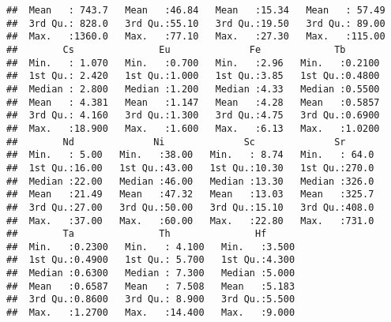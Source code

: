 \documentclass[]{article}
\begin{document}
\begin{verbatim}
##  Mean   : 743.7   Mean   :46.84   Mean   :15.34   Mean   : 57.49  
##  3rd Qu.: 828.0   3rd Qu.:55.10   3rd Qu.:19.50   3rd Qu.: 89.00  
##  Max.   :1360.0   Max.   :77.10   Max.   :27.30   Max.   :115.00  
##        Cs               Eu              Fe             Tb        
##  Min.   : 1.070   Min.   :0.700   Min.   :2.96   Min.   :0.2100  
##  1st Qu.: 2.420   1st Qu.:1.000   1st Qu.:3.85   1st Qu.:0.4800  
##  Median : 2.800   Median :1.200   Median :4.33   Median :0.5500  
##  Mean   : 4.381   Mean   :1.147   Mean   :4.28   Mean   :0.5857  
##  3rd Qu.: 4.160   3rd Qu.:1.300   3rd Qu.:4.75   3rd Qu.:0.6900  
##  Max.   :18.900   Max.   :1.600   Max.   :6.13   Max.   :1.0200  
##        Nd              Ni              Sc              Sr       
##  Min.   : 5.00   Min.   :38.00   Min.   : 8.74   Min.   : 64.0  
##  1st Qu.:16.00   1st Qu.:43.00   1st Qu.:10.30   1st Qu.:270.0  
##  Median :22.00   Median :46.00   Median :13.30   Median :326.0  
##  Mean   :21.49   Mean   :47.32   Mean   :13.03   Mean   :325.7  
##  3rd Qu.:27.00   3rd Qu.:50.00   3rd Qu.:15.10   3rd Qu.:408.0  
##  Max.   :37.00   Max.   :60.00   Max.   :22.80   Max.   :731.0  
##        Ta               Th               Hf       
##  Min.   :0.2300   Min.   : 4.100   Min.   :3.500  
##  1st Qu.:0.4900   1st Qu.: 5.700   1st Qu.:4.300  
##  Median :0.6300   Median : 7.300   Median :5.000  
##  Mean   :0.6587   Mean   : 7.508   Mean   :5.183  
##  3rd Qu.:0.8600   3rd Qu.: 8.900   3rd Qu.:5.500  
##  Max.   :1.2700   Max.   :14.400   Max.   :9.000
\end{verbatim}
\end{document}
